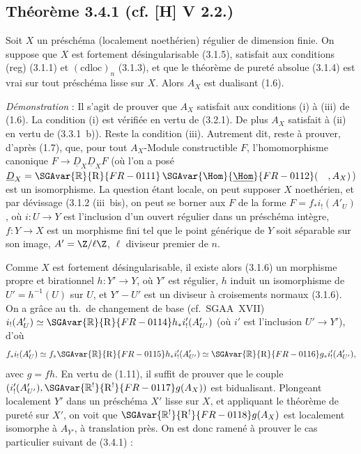 \subsection*{Théorème 3.4.1 (cf. [H] V 2.2.)}
Soit $X$ un préschéma (localement noethérien) régulier de dimension finie. On suppose que $X$ est fortement désingularisable (3.1.5), satisfait aux conditions (reg) (3.1.1) et $(\mathrm{cdloc})_n$ (3.1.3), et que le théorème de pureté absolue (3.1.4) est vrai sur tout préschéma lisse sur $X$. Alors $A_X$ est dualisant (1.6).

\emph{Démonstration} : Il s'agit de prouver que $A_X$ satisfait aux conditions (i) à (iii) de (1.6). La condition (i) est vérifiée en vertu de (3.2.1). De plus $A_X$ satisfait à (ii) en vertu de (3.3.1~b)). Reste la condition (iii). Autrement dit, reste à prouver, d'après (1.7), que, pour tout $A_X$-Module constructible $F$, l'homomorphisme canonique $F \to \underline{D}_X \underline{D}_X F$ (où l'on a posé $\underline{D}_X = \SGAvar{\mathbb{R}}{\mathrm{R}}{FR-0111}\,\SGAvar{\Hom}{\underline{\Hom}}{FR-0112}(\quad, A_X)$) est un isomorphisme. La question étant locale, on peut supposer $X$ noethérien, et par dévissage (3.1.2 (iii~bis), on peut se borner aux $F$ de la forme $F = f_{*}i_{!}(A'_U)$, où $i : U \to Y$ est l'inclusion d'un ouvert régulier dans un préschéma intègre, $f : Y \to X$ est un morphisme fini tel que le point générique de $Y$ soit séparable sur son image, $A' = \Z/\ell\Z$, $\ell$ diviseur premier de $n$.

Comme $X$ est fortement désingularisable, il existe alors (3.1.6) un morphisme propre et birationnel $h : Y' \to Y$, où $Y'$ est régulier, $h$ induit un isomorphisme de $U' = h^{-1}(U)$ sur $U$, et $Y' - U'$ est un diviseur à croisements normaux (3.1.6). On a grâce au th.~de changement de base (cf.~SGAA~XVII) $i_{!}(A'_U) \simeq \SGAvar{\mathbb{R}}{\mathrm{R}}{FR-0114} h_{*} i'_{!}(A'_{U'})$ (où $i'$ est l'inclusion $U' \to Y'$), d'où
\[
f_{*} i_{!}(A'_U) \simeq f_{*} \SGAvar{\mathbb{R}}{\mathrm{R}}{FR-0115} h_{*} i'_{!}(A'_{U'}) \simeq \SGAvar{\mathbb{R}}{\mathrm{R}}{FR-0116} g_{*} i'_{!}(A'_{U'}),
\]
avec $g = fh$. En vertu de (1.11), il suffit de prouver que le couple 
$(i'_{!}(A'_{U'}), \SGAvar{\mathbb{R}^{!}}{\mathrm{R}^{!}}{FR-0117}g(A_X))$ est
bidualisant. Plongeant localement $Y'$ dans un préschéma $X'$ lisse sur $X$, et appliquant le théorème de pureté sur $X'$, on voit que $\SGAvar{\mathbb{R}^{!}}{\mathrm{R}^{!}}{FR-0118}g(A_X)$ est localement isomorphe à $A_{Y'}$, à translation près. On est donc ramené à prouver le cas particulier suivant de (3.4.1) :

